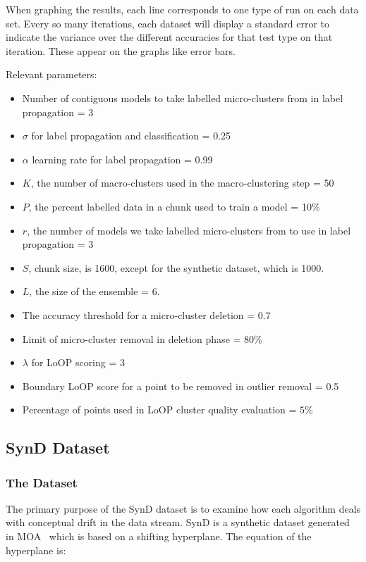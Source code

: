 \documentclass[12pt,a4paper,oneside]{report}
\begin{document}
When graphing the results, each line corresponds to one type of run on each data set. Every so many iterations, each dataset will display a standard error to indicate the variance over the different accuracies for that test type on that iteration. These appear on the graphs like error bars. 

Relevant parameters:
\begin{itemize}
\item Number of contiguous models to take labelled micro-clusters from in label propagation = $3$
\item $\sigma$ for label propagation and classification = 0.25
\item $\alpha$ learning rate for label propagation = 0.99
\item $K$, the number of macro-clusters used in the macro-clustering step = 50
\item $P$, the percent labelled data in a chunk used to train a model = 10\%
\item $r$, the number of models we take labelled micro-clusters from to use in label propagation = 3
\item $S$, chunk size, is 1600, except for the synthetic dataset, which is 1000.
\item $L$, the size of the ensemble = 6. 
\item The accuracy threshold for a micro-cluster deletion = 0.7
\item Limit of micro-cluster removal in deletion phase = $80\%$
\item $\lambda $ for LoOP scoring = 3
\item Boundary LoOP score for a point to be removed in outlier removal = 0.5
\item Percentage of points used in LoOP cluster quality evaluation = $5\%$
\end{itemize}


\subsection*{SynD Dataset}

\subsubsection*{The Dataset}
The primary purpose of the SynD dataset is to examine how each algorithm deals with conceptual drift in the data stream. SynD is a synthetic dataset generated in MOA~\cite{MOA} which is based on a shifting hyperplane. The equation of the hyperplane is:
\end{document}
